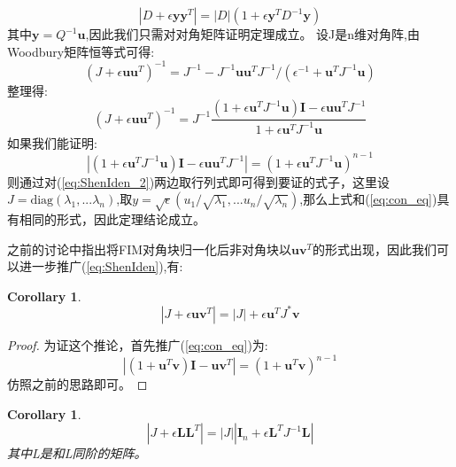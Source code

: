 \documentclass[12pt]{article}
\newtheorem{cor}[thm]{Corollary}
\theoremstyle{remark}
\begin{document}
\begin{equation}
|D+\epsilon \bm{y}\bm{y}^T|=|D|(1+\epsilon \bm{y}^TD^{-1}\bm{y})
\end{equation}
其中$\bm{y}=Q^{-1}\bm{u}$,因此我们只需对对角矩阵证明定理成立。
设J是n维对角阵,由Woodbury矩阵恒等式可得:
\begin{equation}
(J+\epsilon \bm{u}\bm{u}^T)^{-1}=J^{-1}-J^{-1}\bm{u}\bm{u}^TJ^{-1}/(\epsilon^{-1}+\bm{u}^TJ^{-1}\bm{u})
\end{equation}
整理得:
\begin{equation}\label{eq:ShenIden_2}
(J+\epsilon \bm{u}\bm{u}^T)^{-1}=J^{-1}\frac{(1+\epsilon\bm{u}^TJ^{-1}\bm{u})\bm{I}-\epsilon \bm{u}\bm{u}^TJ^{-1}}{1+\epsilon\bm{u}^TJ^{-1}\bm{u}}
\end{equation}
如果我们能证明:
\begin{equation}
|(1+\epsilon\bm{u}^TJ^{-1}\bm{u})\bm{I}-\epsilon \bm{u}\bm{u}^TJ^{-1}|=(1+\epsilon\bm{u}^TJ^{-1}\bm{u})^{n-1}
\end{equation}
则通过对(\ref{eq:ShenIden_2})两边取行列式即可得到要证的式子，这里设$J=\text{diag}(\lambda_1,...\lambda_n)$,取$y=\sqrt{\epsilon}(u_1/\sqrt{\lambda_1},...u_n/\sqrt{\lambda_n})$,那么上式和(\ref{eq:con_eq})具有相同的形式，因此定理结论成立。

之前的讨论中指出将FIM对角块归一化后非对角块以$\bm{u}\bm{v}^T$的形式出现，因此我们可以进一步推广(\ref{eq:ShenIden}),有:
\begin{cor}
\begin{equation}
|J+\epsilon \bm{u}\bm{v}^T|=|J|+\epsilon \bm{u}^TJ^*\bm{v}
\end{equation}
\end{cor}
\begin{proof}
为证这个推论，首先推广(\ref{eq:con_eq})为:
\begin{equation}
|(1+\bm{u}^T\bm{v})\bm{I}-\bm{u}\bm{v}^T|=(1+\bm{u}^T\bm{v})^{n-1}
\end{equation}
仿照之前的思路即可。
\end{proof}
\begin{cor}
\begin{equation}
|J+\epsilon \bm{L}\bm{L}^T|=|J||\bm{I}_n+\epsilon \bm{L}^TJ^{-1}\bm{L}|
\end{equation}
其中L是和L同阶的矩阵。
\end{cor}
\end{document}

